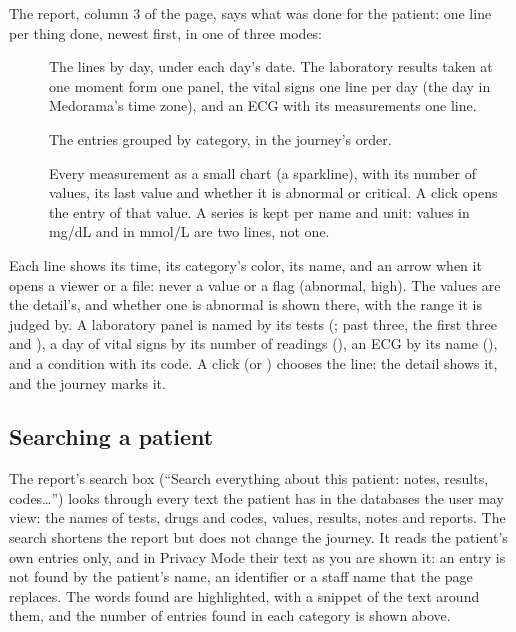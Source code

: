 The report, column 3 of the page, says what was done for the patient: one line per thing done,
newest first, in one of three modes:
\begin{description}
\item[] The lines by day, under each day's date. The laboratory results taken at
  one moment form one panel, the vital signs one line per day (the day in Medorama's time zone),
  and an ECG with its measurements one line.
\item[] The entries grouped by category, in the journey's order.
\item[] Every measurement as a small chart (a sparkline), with its number of values,
  its last value and whether it is abnormal or critical. A click opens the entry of that value.
  A series is kept per name and unit: values in mg/dL and in mmol/L are two lines, not one.
\end{description}
Each line shows its time, its category's color, its name, and an arrow when it opens a viewer
or a file: never a value or a flag (abnormal, high). The values are the detail's, and whether one
is abnormal is shown there, with the range it is judged by. A laboratory panel is named by its
tests (; past three, the first three and ), a day
of vital signs by its number of readings (), an ECG by its name
(), and a condition with its code. A click (or ) chooses the line:
the detail shows it, and the journey marks it.

\subsection{Searching a patient}
\label{sec:patients-search}

The report's search box (``Search everything about this patient: notes, results, codes\dots'')
looks through every text the patient has in the databases the user may view: the names of tests,
drugs and codes, values, results, notes and reports. The search shortens the report but does not change the journey. It reads the
patient's own entries only, and in Privacy Mode their text as you are shown it: an entry is not
found by the patient's name, an identifier or a staff name that the page replaces. The words
found are highlighted, with a snippet of the text around them, and the number of entries found
in each category is shown above.


